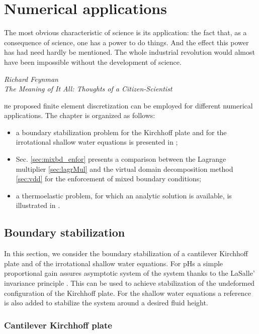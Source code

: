 \chapter{Numerical applications}\label{ch:applications}

\epigraph{The most obvious characteristic of science is its application: the fact that, as a consequence of science, one has a power to do things. And the effect this power has had need hardly be mentioned. The whole industrial revolution would almost have been impossible without the development of science.}{\textit{Richard Feynman \\ The Meaning of It All: Thoughts of a Citizen-Scientist}}
\minitoc

\lettrine{\color{theme}{T}}he proposed finite element discretization can be employed for different numerical applications. The chapter is organized as follows:
\begin{itemize}
	\item a boundary stabilization problem for the Kirchhoff plate and for the irrotational shallow water equations is presented in ;
	\item Sec. \ref{sec:mixbd_enfor} presents a comparison between the Lagrange multiplier \ref{sec:lagrMul} and the virtual domain decomposition method \ref{sec:vdd} for the enforcement of mixed boundary conditions;
	\item a thermoelastic problem, for which an analytic solution is available, is illustrated in .
\end{itemize}



\section{Boundary stabilization}\label{sec:bd_stab}

In this section, we consider the boundary stabilization of a cantilever Kirchhoff plate and of the irrotational shallow water equations. For pHs a simple proportional gain assures asymptotic system of the system thanks to the LaSalle’ invariance principle \cite[Proposition 6.2]{duindam2009}. This can be used to achieve stabilization of the undeformed configuration of the Kirchhoff plate. For the shallow water equations a reference is also added to stabilize the system around a desired fluid height.


\subsection{Cantilever Kirchhoff plate}\label{sec:bd_stabKP}

